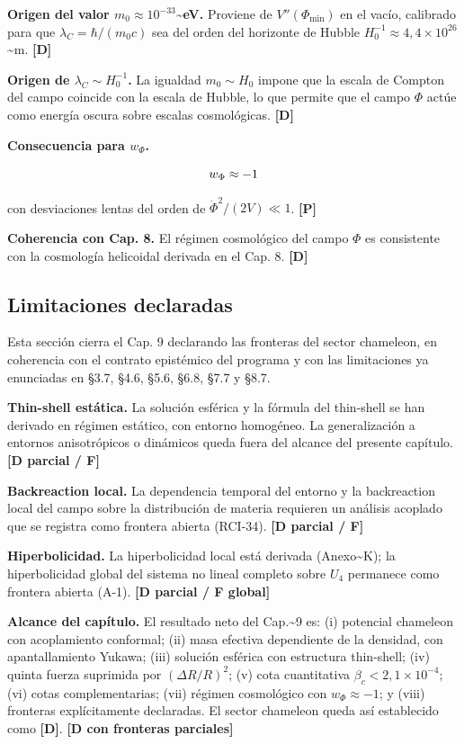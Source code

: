 ﻿\documentclass[11pt,letterpaper]{article}
\begin{document}
\textbf{Origen del valor $m_0 \approx 10^{-33}$\textasciitilde{}eV.} Proviene de $V''(\Phi_{\text{min}})$ en el vacío, calibrado para que $\lambda_C = \hbar/(m_0 c)$ sea del orden del horizonte de Hubble $H_0^{-1} \approx 4{,}4 \times 10^{26}$\textasciitilde{}m. \textbf{[D]}

\textbf{Origen de $\lambda_C \sim H_0^{-1}$.} La igualdad $m_0 \sim H_0$ impone que la escala de Compton del campo coincide con la escala de Hubble, lo que permite que el campo $\Phi$ actúe como energía oscura sobre escalas cosmológicas. \textbf{[D]}

\textbf{Consecuencia para $w_\Phi$.}

\begin{equation*}
  \resizebox{\ifdim\width>\linewidth \linewidth\else\width\fi}{!}{$\displaystyle w_\Phi \approx -1$}
\end{equation*}

con desviaciones lentas del orden de $\dot\Phi^2/(2V) \ll 1$. \textbf{[P]}

\textbf{Coherencia con Cap. 8.} El régimen cosmológico del campo $\Phi$ es consistente con la cosmología helicoidal derivada en el Cap. 8. \textbf{[D]}
\subsection{Limitaciones declaradas}
Esta sección cierra el Cap. 9 declarando las fronteras del sector chameleon, en coherencia con el contrato epistémico del programa y con las limitaciones ya enunciadas en §3.7, §4.6, §5.6, §6.8, §7.7 y §8.7.

\textbf{Thin-shell estática.} La solución esférica y la fórmula del thin-shell se han derivado en régimen estático, con entorno homogéneo. La generalización a entornos anisotrópicos o dinámicos queda fuera del alcance del presente capítulo. \textbf{[D parcial / F]}

\textbf{Backreaction local.} La dependencia temporal del entorno y la backreaction local del campo sobre la distribución de materia requieren un análisis acoplado que se registra como frontera abierta (RCI-34). \textbf{[D parcial / F]}

\textbf{Hiperbolicidad.} La hiperbolicidad local está derivada (Anexo\textasciitilde{}K); la hiperbolicidad global del sistema no lineal completo sobre $U_4$ permanece como frontera abierta (A-1). \textbf{[D parcial / F global]}

\textbf{Alcance del capítulo.} El resultado neto del Cap.\textasciitilde{}9 es: (i) potencial chameleon con acoplamiento conformal; (ii) masa efectiva dependiente de la densidad, con apantallamiento Yukawa; (iii) solución esférica con estructura thin-shell; (iv) quinta fuerza suprimida por $(\Delta R/R)^2$; (v) cota cuantitativa $\beta_c < 2{,}1 \times 10^{-4}$; (vi) cotas complementarias; (vii) régimen cosmológico con $w_\Phi \approx -1$; y (viii) fronteras explícitamente declaradas. El sector chameleon queda así establecido como \textbf{[D]}. \textbf{[D con fronteras parciales]}
\end{document}

